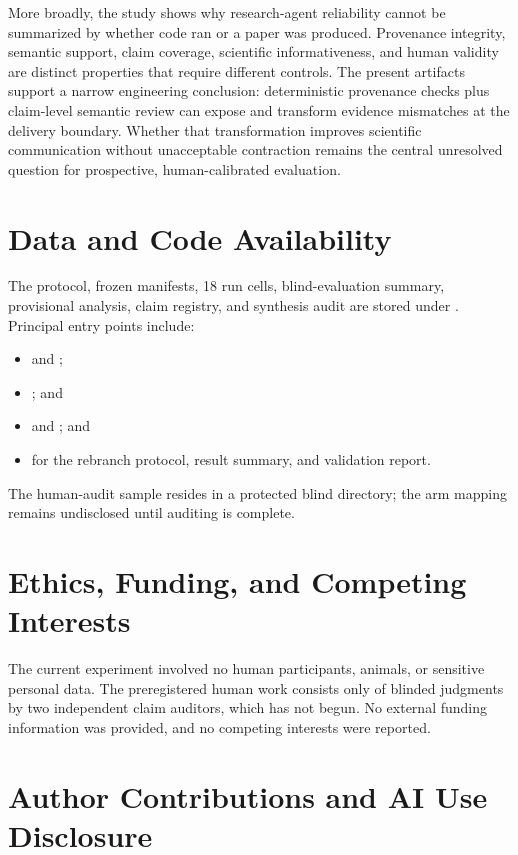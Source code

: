 \documentclass[11pt]{article}
\begin{document}
More broadly, the study shows why research-agent reliability cannot be summarized by whether code ran or a paper was produced. Provenance integrity, semantic support, claim coverage, scientific informativeness, and human validity are distinct properties that require different controls. The present artifacts support a narrow engineering conclusion: deterministic provenance checks plus claim-level semantic review can expose and transform evidence mismatches at the delivery boundary. Whether that transformation improves scientific communication without unacceptable contraction remains the central unresolved question for prospective, human-calibrated evaluation.

\section*{Data and Code Availability}

The protocol, frozen manifests, 18 run cells, blind-evaluation summary, provisional analysis, claim registry, and synthesis audit are stored under . Principal entry points include:
\begin{itemize}
  \item {} and ;
  \item {}; and
  \item {} and ; and
  \item {} for the rebranch protocol, result summary, and validation report.
\end{itemize}
The human-audit sample resides in a protected blind directory; the arm mapping remains undisclosed until auditing is complete.

\section*{Ethics, Funding, and Competing Interests}

The current experiment involved no human participants, animals, or sensitive personal data. The preregistered human work consists only of blinded judgments by two independent claim auditors, which has not begun. No external funding information was provided, and no competing interests were reported.

\section*{Author Contributions and AI Use Disclosure}
\end{document}

